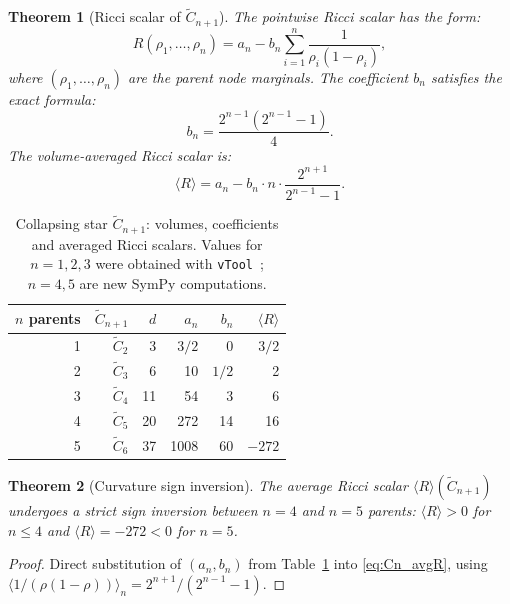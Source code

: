 \documentclass[11pt]{article}
\newtheorem{theorem}{Theorem}[section]
\theoremstyle{definition}
\begin{document}
\begin{theorem}[Ricci scalar of $\tilde{C}_{n+1}$]\label{thm:Cn_R}
The pointwise Ricci scalar has the form:
\begin{equation}\label{eq:Cn_R}
  R(\rho_1,\ldots,\rho_n) = a_n - b_n \sum_{i=1}^n \frac{1}{\rho_i(1-\rho_i)},
\end{equation}
where $(\rho_1,\ldots,\rho_n)$ are the parent node marginals.  
The coefficient $b_n$ satisfies the exact formula:
\begin{equation}\label{eq:bn}
  b_n = \frac{2^{n-1}(2^{n-1}-1)}{4}.
\end{equation}
The volume-averaged Ricci scalar is:
\begin{equation}\label{eq:Cn_avgR}
  \langle R\rangle = a_n - b_n \cdot n \cdot \frac{2^{n+1}}{2^{n-1}-1}.
\end{equation}
\end{theorem}

\begin{table}[h]
\centering
\caption{Collapsing star $\tilde{C}_{n+1}$: volumes, coefficients and 
averaged Ricci scalars.  Values for $n=1,2,3$ were obtained with 
\texttt{vTool}~\cite{Rod04}; $n=4,5$ are new SymPy computations.}
\label{tab:Cn}
\begin{tabular}{@{}rrrrrr@{}}
\toprule
$n$ parents & $\tilde{C}_{n+1}$ & $d$ & $a_n$ & $b_n$ & $\langle R\rangle$ \\
\midrule
1 & $\tilde{C}_2$ &  3 & $3/2$ &  0  & $3/2$  \\
2 & $\tilde{C}_3$ &  6 & 10    & $1/2$ & 2   \\
3 & $\tilde{C}_4$ & 11 & 54    &  3  & 6      \\
4 & $\tilde{C}_5$ & 20 & 272   & 14  & 16     \\
5 & $\tilde{C}_6$ & 37 & 1008  & 60  & $-272$ \\
\bottomrule
\end{tabular}
\end{table}

\begin{theorem}[Curvature sign inversion]\label{thm:curv_transition}
The average Ricci scalar $\langle R\rangle(\tilde{C}_{n+1})$ undergoes 
a strict sign inversion between $n=4$ and $n=5$ parents: 
$\langle R\rangle > 0$ for $n \leq 4$ and $\langle R\rangle = -272 < 0$ for $n=5$.
\end{theorem}

\begin{proof}
Direct substitution of $(a_n, b_n)$ from Table~\ref{tab:Cn} into 
\eqref{eq:Cn_avgR}, using $\langle 1/(\rho(1-\rho))\rangle_n = 2^{n+1}/(2^{n-1}-1)$.
\end{proof}
\end{document}
